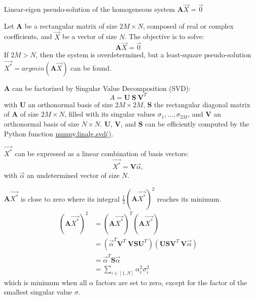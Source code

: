\begin{algorithm}[!ht]
  \caption{Linear-eigen pseudo-solution of the homogeneous system \(\textbf{A} \overrightarrow{X} = \overrightarrow{0}\)}\label{alg:svd}
  \begin{algorithmic}[1]
      \STATEx Let $\textbf{A}$ be a rectangular matrix of size $2M \times N$, composed of real or complex coefficients, and $\overrightarrow{X}$ be a vector of size $N$. The objective is to solve: 
      \begin{equation}
        \textbf{A} \overrightarrow{X} = \overrightarrow{0}
      \end{equation}
      \STATEx If $2M>N$, then the system is overdetermined, but a least-square pseudo-solution \newline
      $\overrightarrow{X^*} = argmin(\textbf{A} \overrightarrow{X})$ can be found.
      
      \STATE \textbf{A} can be factorized by Singular Value Decomposition (SVD):
      \begin{equation}
        A = \textbf{U} \ \textbf{S} \ \textbf{V}^T
      \end{equation}
      with $\textbf{U}$ an orthonormal basis of size $2M \times 2M$, \(\textbf{S}\) the rectangular diagonal matrix of \textbf{A} of size $2M \times N$, filled with its singular values \(\sigma_1, \dots, \sigma_{2M}\), and $\textbf{V}$ an orthonormal basis of size $N \times N$. $\textbf{U}$, $\textbf{V}$, and $\textbf{S}$ can be efficiently computed by the Python function \href{https://numpy.org/doc/stable/reference/generated/numpy.linalg.svd.html}{numpy.linalg.svd()}.
      
      \STATE \(\overrightarrow{X^*}\) can be expressed as a linear combination of basis vectors: 
      \begin{equation}\label{eq:xva}
        \overrightarrow{X^*} = \textbf{V} \overrightarrow{\alpha},
      \end{equation}
      with \(\overrightarrow{\alpha}\) an undetermined vector of size $N$.  
      
      \STATE \(\textbf{A}\overrightarrow{X^*}\) is close to zero where its integral \(\frac{1}{2}(\textbf{A}\overrightarrow{X^*})^2\) reaches its minimum.
      \begin{equation}
          \begin{aligned}
          (\textbf{A}\overrightarrow{X^*})^2 & = (\textbf{A} \overrightarrow{X^*})^T (\textbf{A} \overrightarrow{X^*})\\
          & = (\overrightarrow{\alpha}^T \textbf{V}^T \ \textbf{V} \textbf{S} \textbf{U}^T)(\textbf{U} \textbf{S} \textbf{V}^T \ \textbf{V}\overrightarrow{\alpha})\\
          & = \overrightarrow{\alpha}^T \textbf{S} \overrightarrow{\alpha}\\
          & = \sum_{i \in [1,N]} \alpha_i^2 \sigma_i^2
          \end{aligned}
      \end{equation}
      which is minimum when all \(\alpha\) factors are set to zero, except for the factor of the smallest singular value \(\sigma\). 


\end{algorithmic}
\end{algorithm}
